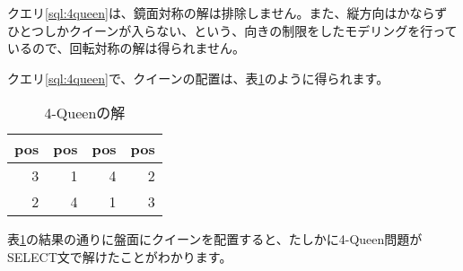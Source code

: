 クエリ\ref{sql:4queen}は、鏡面対称の解は排除しません。また、縦方向はかならずひとつしかクイーンが入らない、という、向きの制限をしたモデリングを行っているので、回転対称の解は得られません。

クエリ\ref{sql:4queen}で、クイーンの配置は、表\ref{table:4queen}のように得られます。


\begin{table}[htbp]
  \begin{tabular}{|r|r|r|r|} \hline
    pos & pos & pos & pos \\ \hline \hline  
    3 & 1 & 4 & 2 \\
    2 & 4 & 1 & 3 \\ \hline
  \end{tabular}
  \caption{4-Queenの解}
  \label{table:4queen}
\end{table}

表\ref{table:4queen}の結果の通りに盤面にクイーンを配置すると、たしかに4-Queen問題がSELECT文で解けたことがわかります。




